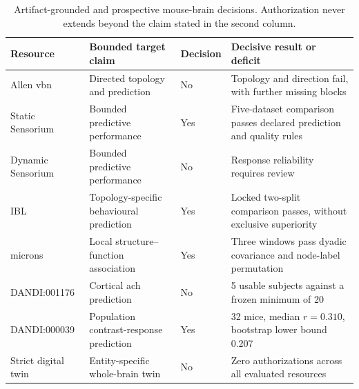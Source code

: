 \begin{table}[t!]
\centering
\caption{Artifact-grounded and prospective mouse-brain decisions. Authorization never extends beyond the claim stated in the second column.}
\label{tab:prospective-applications}
\footnotesize
\renewcommand{\arraystretch}{1.08}
\begin{tabularx}{\textwidth}{@{}P{0.17\textwidth}P{0.23\textwidth}P{0.10\textwidth}Y@{}}
\toprule
Resource & Bounded target claim & Decision & Decisive result or deficit \\
\midrule
Allen \ac{vbn} & Directed topology and prediction & No & Topology and direction fail, with further missing blocks \\
Static Sensorium & Bounded predictive performance & Yes & Five-dataset comparison passes declared prediction and quality rules \\
Dynamic Sensorium & Bounded predictive performance & No & Response reliability requires review \\
IBL & Topology-specific behavioural prediction & Yes & Locked two-split comparison passes, without exclusive superiority \\
\ac{microns} & Local structure--function association & Yes & Three windows pass dyadic covariance and node-label permutation \\
DANDI:001176 & Cortical \ac{ach} prediction & No & 5 usable subjects against a frozen minimum of 20 \\
DANDI:000039 & Population contrast-response prediction & Yes & 32 mice, median $r=0.310$, bootstrap lower bound 0.207 \\
Strict digital twin & Entity-specific whole-brain twin & No & Zero authorizations across all evaluated resources \\
\bottomrule
\end{tabularx}
\end{table}

